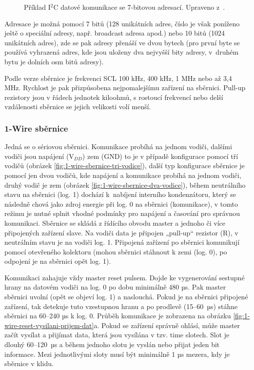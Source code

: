 \begin{figure}[H]
    \centering
    \def\svgwidth{\columnwidth}
    
    \caption[Příklad I$^2$C datové komunikace se 7-bitovou adresací.]{Příklad I$^2$C datové komunikace se 7-bitovou adresací. Upraveno z~\cite{i2c-sbernice-datovy-paket-7bit-adresa}.}
    \label{fig:i2c-sbernice-datova-komunikace-7bit-adresa}
\end{figure}

Adresace je možná pomocí 7 bitů (128 unikátních adres, číslo je však poníženo ještě o speciální adresy, např. broadcast adresa apod.) nebo 10 bitů (1024 unikátních adres), zde se pak adresy přenáší ve dvou bytech (pro první byte se používá vyhrazená adres, kde jsou uloženy dva nejvyšší bity adresy, v~druhém bytu je dolních osm bitů adresy).

Podle verze sběrnice je frekvenci SCL 100 kHz, 400 kHz, 1 MHz nebo až 3,4 MHz. Rychlost je pak přizpůsobena nejpomalejšímu zařízení na sběrnici. Pull-up rezistory jsou v řádech jednotek kiloohmů, s rostoucí frekvencí nebo delší vzdálenosti sběrnice se jejich velikosti volí menší.




\subsubsection{1-Wire sběrnice}
Jedná se o sériovou sběrnici. Komunikace probíhá na jednom vodiči, dalšími vodiči jsou napájení (V$_{DD}$) zem (GND) to je v případě konfigurace pomocí tří vodičů (obrázek \ref{fig:1-wire-sbernice-tri-vodice}), další typ konfigurace sběrnice je pomocí jen dvou vodičů, kde napájení a komunikace probíhá na jednom vodiči, druhý vodič je zem (obrázek \ref{fig:1-wire-sbernice-dva-vodice}), během neutrálního stavu na sběrnici (log. 1) dochází k~nabíjení interního kondenzátoru, který se následně chová jako zdroj energie při log. 0 na sběrnici (komunikace), v tomto režimu je nutné splnit vhodné podmínky pro napájení a časování pro správnou komunikaci. Sběrnice se skládá z řídícího obvodu master a jednoho či více připojených zařízení slave. Na vodiči data je připojen „pull-up“ rezistor (R), v neutrálním stavu je na vodiči log. 1. Připojená zařízení po sběrnici komunikují pomocí otevřeného kolektoru (mohou sběrnici stáhnout k zemi (log. 0), po odpojení je na sběrnici opět log. 1).

Komunikaci zahajuje vždy master reset pulsem. Dojde ke vygenerování sestupné hrany na datovém vodiči na log. 0 po dobu minimálně 480 µs. Pak master sběrnici uvolní (opět se objeví log. 1) a naslouchá. Pokud je na sběrnici připojené zařízení, tak detekuje tuto vzestupnou hranu a po prodlevě (15–60~µs) stáhne sběrnici na 60–240 µs k log. 0. Průběh komunikace je zobrazena na obrázku \ref{fig:1-wire-reset-vysilani-prijem-dat}a. Pokud se zařízení správně ohlásí, může master začít vysílat a přijímat data, která jsou vysílána v tzv. time slotech. Slot je dlouhý 60–120~µs a během jednoho slotu je vyslán nebo přijat jeden bit informace. Mezi jednotlivými sloty musí být minimálně 1 µs mezera, kdy je sběrnice v klidu. 

